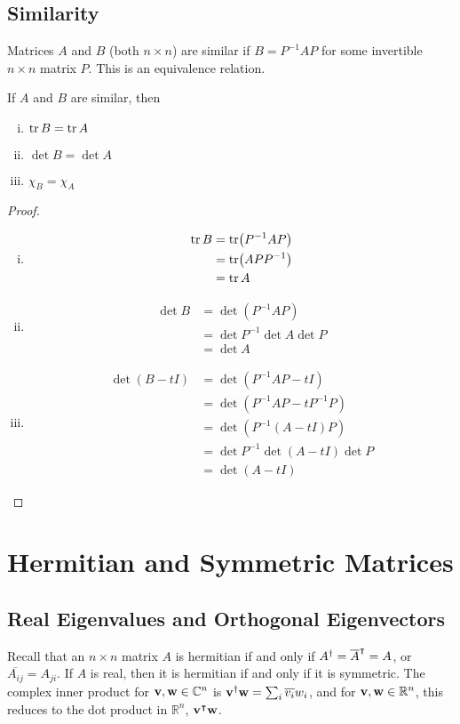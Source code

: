 \documentclass{article}
\begin{document}
\subsection{Similarity}
Matrices $A$ and $B$ (both $n \times n$) are similar if $B = P^{-1}AP$ for some invertible $n\times n$ matrix $P$. This is an equivalence relation.
\begin{proposition}
    If $A$ and $B$ are similar, then
    \begin{enumerate}[(i)]
        \item $\tr B = \tr A$
        \item $\det B = \det A$
        \item $\chi_B = \chi_A$
    \end{enumerate}
\end{proposition}
\begin{proof}
    \begin{enumerate}[(i)]
        \item \begin{align*}
                  \tr B & = \tr (P^{-1}AP) \\&= \tr(APP^{-1}) \\&= \tr A
              \end{align*}
        \item \begin{align*}
                  \det B & = \det (P^{-1}AP) \\&= \det P^{-1} \det A \det P \\&= \det A
              \end{align*}
        \item \begin{align*}
                  \det(B - tI) & = \det(P^{-1}AP - tI) \\&= \det(P^{-1}AP - tP^{-1}P) \\&= \det(P^{-1}(A - tI)P) \\&= \det P^{-1} \det(A - tI) \det P \\&= \det(A - tI)
              \end{align*}
    \end{enumerate}
\end{proof}

\section{Hermitian and Symmetric Matrices}
\subsection{Real Eigenvalues and Orthogonal Eigenvectors}
Recall that an $n\times n$ matrix $A$ is hermitian if and only if $A^\dagger = \overline{A}^\intercal = A$, or $\overline{A_{ij}} = A_{ji}$. If $A$ is real, then it is hermitian if and only if it is symmetric. The complex inner product for $\vb v, \vb w \in \mathbb C^n$ is $\vb v^\dagger \vb w = \sum_i \overline{v_i}w_i$, and for $\vb v, \vb w \in \mathbb R^n$, this reduces to the dot product in $\mathbb R^n$, $\vb v^\intercal \vb w$.
\end{document}
